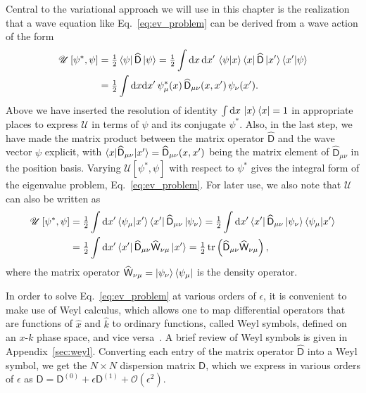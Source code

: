 Central to the variational approach we will use in this chapter is the realization that
a wave equation like Eq.~\eqref{eq:ev_problem} can be derived from a wave action of the form~\cite{kaufman1987}
%
\begin{equation}
  \begin{aligned}
    \mathscr{U}\left[\psi^{*}, \psi\right] &= \tfrac{1}{2}\mathinner{\langle{\psi}\rvert}\widehat{\mathsf{D}}\mathinner{\lvert{\psi}\rangle}
  = \tfrac{1}{2}\int \mathrm{d}{x}\,\mathrm{d}{x'}\, \mathinner{\langle{\psi|x}\rangle}\mathinner{\langle{x}\rvert}\widehat{\mathsf{D}}\mathinner{\lvert{x'}\rangle}\mathinner{\langle{x'|\psi}\rangle}\\
                                           &= \tfrac{1}{2}\int \mathrm{d}{x}\mathrm{d}{x'}\, \psi^{*}_{\mu}(x)\,\widehat{\mathsf{D}}_{\mu\nu}(x, x')\,\psi_{\nu}(x').
  \label{eq:wave_action}
  \end{aligned}
\end{equation}
%
Above we have inserted the resolution of identity $\int \mathrm{d}{x}\,\mathinner{\lvert{x}\rangle}\mathinner{\langle{x}\rvert} = 1$ in appropriate places to express $\mathscr{U}$ in terms of $\psi$ and its conjugate $\psi^{*}$.
Also, in the last step, we have made the matrix product between the matrix operator $\widehat{\mathsf{D}}$ and the wave vector $\psi$ explicit, with $\mathinner{\langle{x|\widehat{\mathsf{D}}_{\mu\nu}|x'}\rangle} = \widehat{\mathsf{D}}_{\mu\nu}(x, x')$ being the matrix element of $\widehat{\mathsf{D}}_{\mu\nu}$ in the position basis.
Varying $\mathscr{U}[\psi^{*}, \psi]$ with respect to $\psi^{*}$ gives the integral form of the eigenvalue problem, Eq.~\eqref{eq:ev_problem}.
For later use, we also note that $\mathscr{U}$ can also be written as
%
\begin{equation}
  \begin{aligned}
    \mathscr{U}\left[\psi^{*}, \psi\right] &= \tfrac{1}{2}\int \mathrm{d}{x}' \mathinner{\langle{\psi_{\mu}|x'}\rangle}\mathinner{\langle{x'}\rvert}\widehat{\mathsf{D}}_{\mu\nu}\mathinner{\lvert{\psi_{\nu}}\rangle}
= \tfrac{1}{2}\int \mathrm{d}{x}' \mathinner{\langle{x'}\rvert}\widehat{\mathsf{D}}_{\mu\nu}\mathinner{\lvert{\psi_{\nu}}\rangle} \mathinner{\langle{\psi_{\mu}|x'}\rangle}\\
&= \tfrac{1}{2}\int \mathrm{d}{x}' \mathinner{\langle{x'}\rvert}\widehat{\mathsf{D}}_{\mu\nu}\widehat{\mathsf{W}}_{\nu\mu}\mathinner{\lvert{x'}\rangle} = \tfrac{1}{2}\operatorname{tr}\left(\widehat{\mathsf{D}}_{\mu\nu}\widehat{\mathsf{W}}_{\nu\mu}\right),
  \label{eq:wave_action_trace_form}
  \end{aligned}
\end{equation}
%
where the matrix operator $\widehat{\mathsf{W}}_{\nu\mu} = \mathinner{\lvert{\psi_{\nu}}\rangle}\mathinner{\langle{\psi_{\mu}}\rvert}$ is the density operator.

In order to solve Eq.~\eqref{eq:ev_problem} at various orders of $\epsilon$, it is convenient to make use of Weyl calculus, which allows one to map differential operators that are functions of $\hat{x}$ and $\hat{k}$ to ordinary functions, called Weyl symbols, defined on an $x$-$k$ phase space, and vice versa~\cite{chaichian2001,cohen2012}.
A brief review of Weyl symbols is given in Appendix~\ref{sec:weyl}.
Converting each entry of the matrix operator $\widehat{\mathsf{D}}$ into a Weyl symbol, we get the $N\times N$ dispersion matrix $\mathsf{D}$, which we express in various orders of $\epsilon$ as $\mathsf{D} = \mathsf{D}^{(0)} + \epsilon\mathsf{D}^{(1)} + \mathcal{O}(\epsilon^{2})$.

